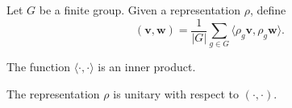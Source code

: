 
\begin{defn}{}{}
	Let \(G\) be a finite group. Given a representation \(\rho\), define \[
		(\mathbf{v}, \mathbf{w}) = \frac{1}{|G|} \sum_{g \in G} \langle \rho_g \mathbf{v}, \rho_g \mathbf{w} \rangle.
	\] 
\end{defn}

\begin{prop}{}{}
	The function \(\langle \cdot, \cdot \rangle\) is an inner product.
\end{prop}

\begin{prop}{}{}
	The representation \(\rho\) is unitary with respect to \((\cdot, \cdot)\).
\end{prop}
